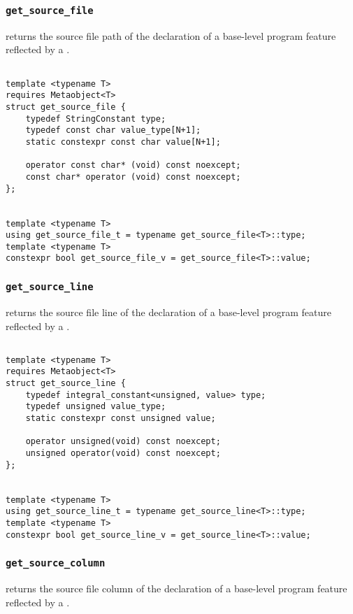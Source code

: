 
\subsubsection{\texttt{get\_source\_file}}

returns the source file path of the declaration of a base-level program feature reflected by a .

\begin{verbatim}

template <typename T>
requires Metaobject<T>
struct get_source_file {
	typedef StringConstant type;
	typedef const char value_type[N+1];
	static constexpr const char value[N+1];

	operator const char* (void) const noexcept;
	const char* operator (void) const noexcept;
};


template <typename T>
using get_source_file_t = typename get_source_file<T>::type;
template <typename T>
constexpr bool get_source_file_v = get_source_file<T>::value;

\end{verbatim}

\subsubsection{\texttt{get\_source\_line}}

returns the source file line of the declaration of a base-level program feature reflected by a .

\begin{verbatim}

template <typename T>
requires Metaobject<T>
struct get_source_line {
	typedef integral_constant<unsigned, value> type;
	typedef unsigned value_type;
	static constexpr const unsigned value;

	operator unsigned(void) const noexcept;
	unsigned operator(void) const noexcept;
};


template <typename T>
using get_source_line_t = typename get_source_line<T>::type;
template <typename T>
constexpr bool get_source_line_v = get_source_line<T>::value;

\end{verbatim}

\subsubsection{\texttt{get\_source\_column}}

returns the source file column of the declaration of a base-level program feature reflected by a .

